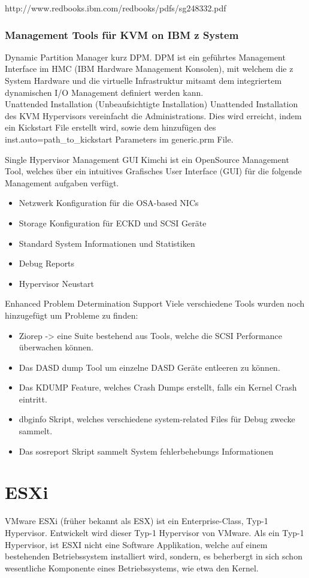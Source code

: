 \documentclass[14pt]{extreport}
\begin{document}
http://www.redbooks.ibm.com/redbooks/pdfs/sg248332.pdf

\subsubsection{Management Tools für KVM on IBM z System}
Dynamic Partition Manager kurz DPM.
DPM ist ein geführtes Management Interface im HMC (IBM Hardware Management Konsolen), mit welchem die z System Hardware und die virtuelle Infrastruktur mitsamt dem integriertem dynamischen I/O Management  definiert werden kann.\\
Unattended Installation (Unbeaufsichtigte Installation)
Unattended Installation des KVM Hypervisors vereinfacht die Administrations. Dies wird erreicht, indem ein Kickstart File erstellt wird, sowie dem hinzufügen des inst.auto=path\_to\_kickstart  Parameters im generic.prm File.

Single Hypervisor Management GUI
Kimchi ist ein OpenSource Management Tool, welches über ein intuitives Grafisches User Interface (GUI) für die folgende Management aufgaben verfügt.
\begin{itemize}
   \item Netzwerk Konfiguration für die OSA-based NICs
   \item Storage Konfiguration für ECKD und SCSI Geräte
   \item Standard System Informationen und Statistiken
   \item Debug Reports
   \item Hypervisor Neustart
\end{itemize}
\newpage
Enhanced Problem Determination Support
Viele verschiedene Tools wurden noch hinzugefügt um Probleme zu finden:
\begin{itemize}
   \item Ziorep -> eine Suite bestehend aus Tools, welche die SCSI Performance überwachen können.
   \item Das DASD dump Tool um einzelne DASD Geräte entleeren zu können.
   \item Das KDUMP Feature, welches Crash Dumps erstellt, falls ein Kernel Crash eintritt.
   \item dbginfo Skript, welches verschiedene system-related Files für Debug zwecke sammelt.
   \item Das sosreport Skript sammelt System fehlerbehebungs Informationen
\end{itemize}

\section{ESXi}
VMware ESXi (früher bekannt als ESX) ist ein Enterprise-Class, Typ-1 Hypervisor. Entwickelt wird dieser Typ-1 Hypervisor von VMware. Als ein Typ-1 Hypervisor, ist ESXI nicht eine Software Applikation, welche auf einem bestehenden Betriebssystem installiert wird, sondern, es beherbergt in sich schon wesentliche Komponente eines Betriebssystems, wie etwa den Kernel. \\
\end{document}
